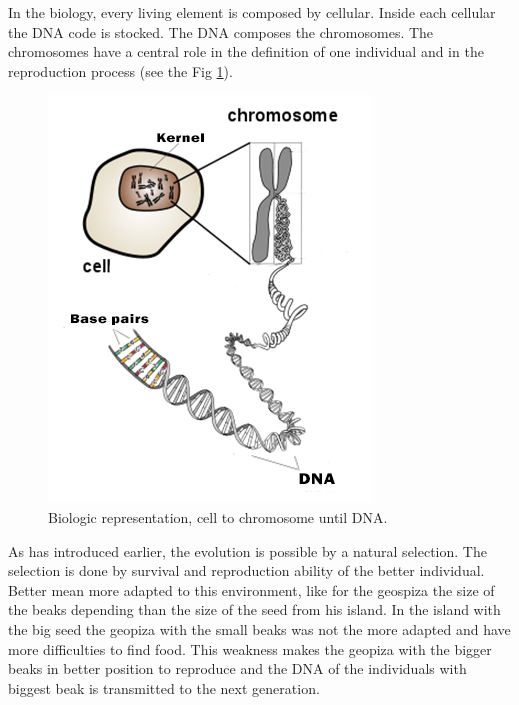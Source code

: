 In the biology, every living element is composed by cellular. Inside each cellular  the DNA code is stocked. The DNA composes the chromosomes. The chromosomes have a central role in the definition of one individual and in the reproduction process (see the Fig \ref{fig:celTokrom}). \\
\begin{figure}[t!]
\center
{}
   \includegraphics[width=\linewidth]{img/celTokromEN.png}
  \caption{Biologic representation, cell to chromosome until DNA.}\label{fig:celTokrom}
  \endminipage\hfill
\end{figure}
As has introduced earlier, the evolution is possible by a natural selection. The selection is done by survival and reproduction ability of the better individual. Better mean more adapted to this environment, like for the geospiza the size of the beaks depending than the size of the seed from his island.
In the island with the big seed  the geopiza with the small beaks was not the more adapted and have more difficulties to find food. This weakness makes the geopiza with the bigger beaks in better position to reproduce and the DNA of the individuals with biggest beak is transmitted to the next generation.\\
